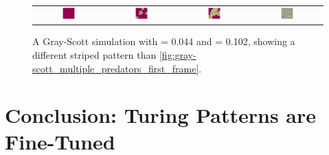 \begin{figure}[h]
\centering
\mySfFamily
\begin{tabular}{c c c c}
\includegraphics[width = 0.19\textwidth]{../images_CMYK/f044_k102_multi_Moment_1} & \includegraphics[width = 0.19\textwidth]{../images_CMYK/f044_k102_multi_Moment_2} & \includegraphics[width = 0.19\textwidth]{../images_CMYK/f044_k102_multi_Moment_3} & \includegraphics[width = 0.19\textwidth]{../images_CMYK/f044_k102_multi_Moment_4}
\end{tabular}
\caption{A Gray-Scott simulation with  = 0.044 and  = 0.102, showing a different striped pattern than \autoref{fig:gray-scott_multiple_predators_first_frame}.}
\label{fig:gray-scott_f44_k102_first_frame}
\end{figure}


\FloatBarrier
{}

\section{Conclusion: Turing Patterns are Fine-Tuned}
\label{sec:conclusion:_turing_patterns_are_fine-tuned}

